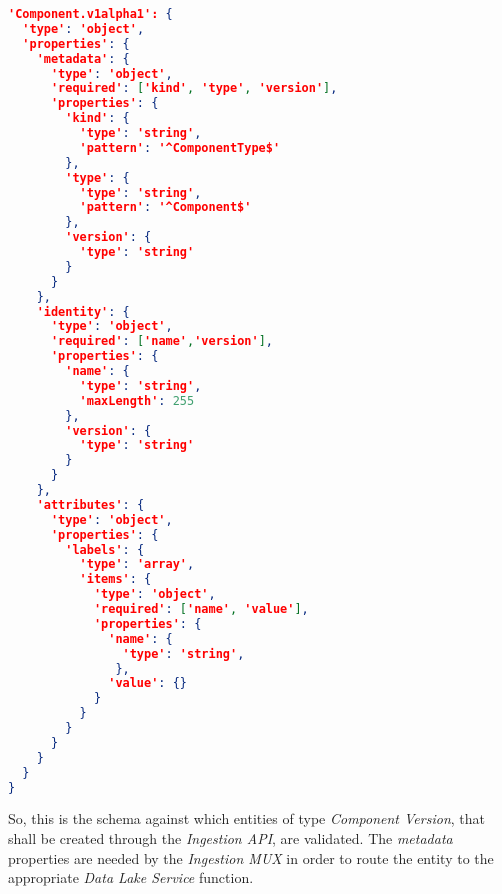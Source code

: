 \begin{lstlisting}[language=json, caption=Component Version Schema, captionpos=b, label=lst:ComponentVersionSchema]
'Component.v1alpha1': {
  'type': 'object',
  'properties': {
    'metadata': {
      'type': 'object',
      'required': ['kind', 'type', 'version'],
      'properties': {
      	'kind': {
      	  'type': 'string',
      	  'pattern': '^ComponentType$'
      	},
        'type': {
          'type': 'string',
          'pattern': '^Component$'
        },
        'version': {
          'type': 'string'
        }
      }
    },
    'identity': {
      'type': 'object',
      'required': ['name','version'],
      'properties': {
        'name': {
          'type': 'string',
          'maxLength': 255
        },
        'version': {
          'type': 'string'
        }
      }
    },
    'attributes': {
      'type': 'object',
      'properties': {
        'labels': {
          'type': 'array',
          'items': {
            'type': 'object',
            'required': ['name', 'value'],
            'properties': {
              'name': {
                'type': 'string',
               },
              'value': {}
            }
          }  
        } 
      }
    }
  }
}
\end{lstlisting}

So, this is the schema against which entities of type \emph{Component Version}, that shall be created through the \emph{Ingestion API}, are validated. The \emph{metadata} properties are needed by the \emph{Ingestion MUX} in order to route the entity to the appropriate \emph{Data Lake Service} function.\\


